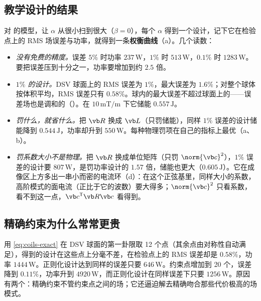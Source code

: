 \subsection{教学设计的结果}
对 的模型，让 $\alpha$ 从很小扫到很大（$\beta=0$），每个 $\alpha$ 得到一个设计，记下它在检验点上的 RMS 场误差与功率，就得到一条\textbf{权衡曲线}（a）。几个读数：
\begin{itemize}
\item \emph{没有免费的精度。}误差 $5\%$ 时功率 $237\,\mathrm W$，$1\%$ 时 $513\,\mathrm W$，$0.1\%$ 时 $1283\,\mathrm W$。要把误差压到十分之一，功率要增加到约 $2.5$ 倍。
\item \emph{$1\%$ 的设计。}DSV 球面上的 RMS 误差为 $1\%$，最大误差为 $1.6\%$；对整个球体按体积平均，RMS 误差只有 $0.58\%$。球内的最大误差不超过球面上的——误差场也是调和的（）。在 $10\,\mathrm{mT/m}$ 下它储能 $0.557\,\mathrm J$。
\item \emph{罚什么，就省什么。}把 $\vb R$ 换成 $\vb L$（只罚储能），同样 $1\%$ 误差的设计储能降到 $0.544\,\mathrm J$，功率却升到 $550\,\mathrm W$。每种物理罚项在自己的指标上最优（a、b）。
\item \emph{罚系数大小不是物理。}把 $\vb R$ 换成单位矩阵（只罚 $\norm{\vb c}^2$），$1\%$ 误差的设计要 $807\,\mathrm W$，是罚功率设计的 $1.57$ 倍，储能也更大（$0.605\,\mathrm J$）。它在成像区上方多出一串小而密的电流环（d）：在这个正弦基里，同样大小的系数，高阶模式的面电流（正比于它的波数）要大得多；$\norm{\vb c}^2$ 只看系数，看不到这一点，$\vb c^{\mathsf T}\vb R\vb c$ 看得到。
\end{itemize}


\subsection{精确约束为什么常常更贵}
用 \eqref{eq:coils-exact} 在 DSV 球面的第一卦限取 12 个点（其余点由对称性自动满足），得到的设计在这些点上分毫不差，在检验点上的 RMS 误差却是 $0.58\%$，功率 $1444\,\mathrm W$。正则化设计达到同样的误差只要 $646\,\mathrm W$。约束点增加到 20 个，误差降到 $0.11\%$，功率升到 $4920\,\mathrm W$，而正则化设计在同样误差下只要 $1256\,\mathrm W$。原因有两个：精确约束不管约束点之间的场；它还逼迫解去精确吻合那些代价极高的场模式。

